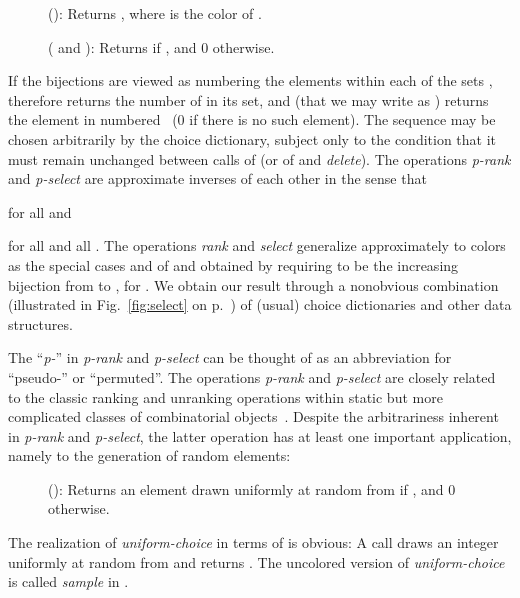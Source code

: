 \documentclass[envcountsame,envcountsect,undated,nolinenumbers]{lnthi}
\def\Tvn#1{\hbox{\textit{#1\/}}}
\begin{document}
\begin{description}
\item[\normalfont]
():
Returns , where  is the
color of .
\item[\normalfont]
( and ):
Returns  if , and 0 otherwise.
\end{description}

If the bijections  are viewed
as numbering the elements within each of the sets
,  therefore
returns the number of  in its set,
and  (that we may write
as ) returns the element
in  numbered~ (0 if there is no such element).
The sequence 
may be chosen arbitrarily by the choice dictionary,
subject only to the condition that it must remain
unchanged between calls of 
(or of  and \Tvn{delete}).
The operations \Tvn{p-rank} and \Tvn{p-select} are
approximate inverses of each other in the sense that

for all  and

for all  and all
.
The operations \Tvn{rank} and \Tvn{select}
generalize approximately to  colors
as the special cases  and
 of  and 
obtained by requiring  to be the increasing
bijection from  to ,
for .
We obtain our result through a nonobvious combination
(illustrated in Fig.~\ref{fig:select}
on p.~\pageref{fig:select})
of (usual) choice dictionaries and other data structures.

The ``\Tvn{p-}'' in \Tvn{p-rank} and \Tvn{p-select} can be thought
of as an abbreviation for ``pseudo-'' or ``permuted''.
The operations \Tvn{p-rank} and \Tvn{p-select}
are closely related to
the classic ranking and
unranking operations within static but more complicated
classes of combinatorial objects~\cite{KreS99}.
Despite the arbitrariness inherent in
\Tvn{p-rank} and \Tvn{p-select}, the latter operation
has at least one important application, namely
to the generation of random elements:

\begin{description}
\item[\normalfont]
():
Returns an element drawn uniformly at random
from  if , and 0 otherwise.
\end{description}

The realization of \Tvn{uniform-choice} in
terms of  is obvious:
A call 
draws an integer  uniformly at random
from  and returns
.
The uncolored version of
\Tvn{uniform-choice} is called \Tvn{sample}
in \cite[Problem 1.3.35]{SedW11}.
\end{document}
